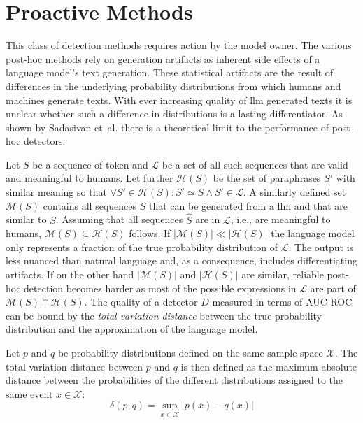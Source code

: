     \chapter{Proactive Methods}
    \label{chap:proactive}
    This class of detection methods requires action by the model owner.
    The various post-hoc methods rely on generation artifacts as inherent side effects of a language model's text generation.
    These statistical artifacts are the result of differences in the underlying probability distributions from which humans and machines generate texts.
    With ever increasing quality of \ac{llm} generated texts it is unclear whether such a difference in distributions is a lasting differentiator.
    As shown by Sadasivan et~al. \cite{sadasivan2023aigenerated} there is a theoretical limit to the performance of post-hoc detectors.
    
    Let $S$ be a sequence of token and $\mathcal{L}$ be a set of all such sequences that are valid and meaningful to humans.
    Let further $\mathcal{H}(S)$ be the set of paraphrases $S'$ with similar meaning so that $\forall S' \in \mathcal{H}(S): S' \simeq S \land S' \in \mathcal{L}$.
    A similarly defined set $\mathcal{M}(S)$ contains all sequences $\hat{S}$ that can be generated from a \ac{llm} and that are similar to $S$.
    Assuming that all sequences $\hat{S}$ are in $\mathcal{L}$, i.e., are meaningful to humans, $\mathcal{M}(S) \subseteq \mathcal{H}(S)$ follows.
    If $|\mathcal{M}(S)| \ll |\mathcal{H}(S)|$ the language model only represents a fraction of the true probability distribution of $\mathcal{L}$.
    The output is less nuanced than natural language and, as a consequence, includes differentiating artifacts.
    If on the other hand $|\mathcal{M}(S)|$ and $|\mathcal{H}(S)|$ are similar, reliable post-hoc detection becomes harder as most of the possible expressions in $\mathcal{L}$ are part of $\mathcal{M}(S) \cap \mathcal{H}(S)$.
    The quality of a detector $D$ measured in terms of AUC-ROC can be bound by the \emph{total variation distance} between the true probability distribution and the approximation of the language model.

    \begin{definition}
        Let $p$ and $q$ be probability distributions defined on the same sample space $\mathcal{X}$.
        The total variation distance between $p$ and $q$ is then defined as the maximum absolute distance between the probabilities of the different distributions assigned to the same event $x \in \mathcal{X}$:
        \begin{equation}
            \delta(p,q) = \sup_{x \in \mathcal{X}} |p(x) - q(x)|
        \end{equation}
    \end{definition}

